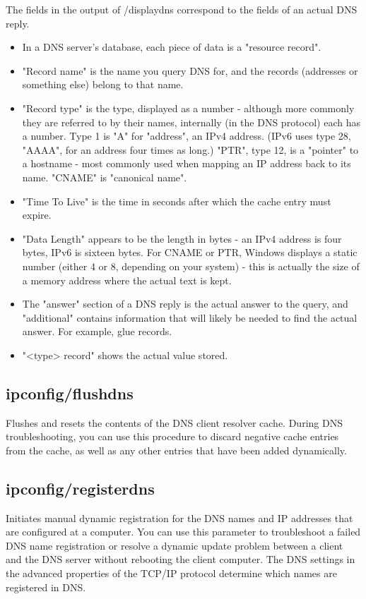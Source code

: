 \documentclass[a4paper,12pt]{article}
\begin{document}
The fields in the output of /displaydns correspond to the fields of an actual DNS reply.

\begin{itemize}
\item{In a DNS server's database, each piece of data is a "resource record".}
\item{"Record name" is the name you query DNS for, and the records (addresses or something else) belong to that name.}
\item{"Record type" is the type, displayed as a number - although more commonly they are referred to by their names, internally (in the DNS protocol) each has a number. Type 1 is "A" for "address", an IPv4 address. (IPv6 uses type 28, "AAAA", for an address four times as long.) "PTR", type 12, is a "pointer" to a hostname - most commonly used when mapping an IP address back to its name. "CNAME" is "canonical name".}
\item{"Time To Live" is the time in seconds after which the cache entry must expire.}
\item{"Data Length" appears to be the length in bytes - an IPv4 address is four bytes, IPv6 is sixteen bytes. For CNAME or PTR, Windows displays a static number (either 4 or 8, depending on your system) - this is actually the size of a memory address where the actual text is kept.}
\item{The "answer" section of a DNS reply is the actual answer to the query, and "additional" contains information that will likely be needed to find the actual answer. For example, glue records.}
\item{"<type> record" shows the actual value stored.}
\end{itemize}


\subsection{ipconfig/flushdns}
Flushes and resets the contents of the DNS client resolver cache. During DNS troubleshooting, you can use this procedure to discard negative cache entries from the cache, as well as any other entries that have been added dynamically.

\subsection{ipconfig/registerdns}
Initiates manual dynamic registration for the DNS names and IP addresses that are configured at a computer. You can use this parameter to troubleshoot a failed DNS name registration or resolve a dynamic update problem between a client and the DNS server without rebooting the client computer. The DNS settings in the advanced properties of the TCP/IP protocol determine which names are registered in DNS.
\end{document}
